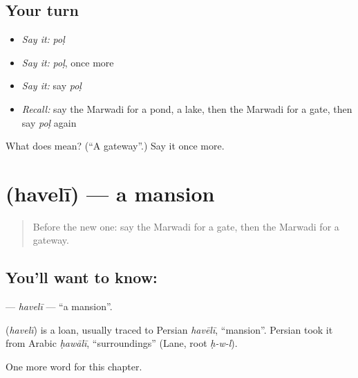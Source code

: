 \subsection*{Your turn}
\begin{itemize}
\raggedright
  \item \emph{Say it:} \emph{poḷ}
  \item \emph{Say it:} \emph{poḷ}, once more
  \item \emph{Say it:} say \emph{poḷ}
  \item \emph{Recall:} say the Marwadi for a pond, a lake, then the Marwadi for a gate, then say \emph{poḷ} again
\end{itemize}

\begin{tcolorbox}[breakable,colback=teal!4,colframe=teal!35!black,title={Before you move on}]
What does  mean? (\textquotedblleft{}A gateway\textquotedblright{}.) Say it once more.
\end{tcolorbox}
\section[\texorpdfstring{\mw{हवेली} (havelī)}{हवेली (havelī)}]{ (havelī) — a mansion}

\label{lesson:MW-C100-haveli}



\begin{quote}
Before the new one: say the Marwadi for a gate, then the Marwadi for a gateway.
\end{quote}

\subsection*{You'll want to know: }
\textbf{} — \emph{havelī} — \textquotedblleft{}a mansion\textquotedblright{}.

\begin{cousinweb}
\textbf{} (\emph{havelī}) is a loan, usually traced to Persian \emph{havēlī}, \textquotedblleft{}mansion\textquotedblright{}. Persian took it from Arabic \emph{ḥawālī}, \textquotedblleft{}surroundings\textquotedblright{} (Lane, root \emph{ḥ-w-l}).
\end{cousinweb}

\begin{grammarlens}[title={What you've built}]
One more word for this chapter.
\end{grammarlens}

